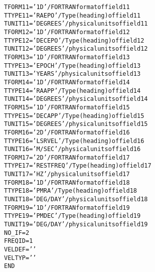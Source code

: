 \documentclass[twoside]{article}
\begin{document}
\begin{alltt}
TFORM11 = '1D      '           / FORTRAN format of field 11
TTYPE11 = 'RAEPO           '   / Type (heading) of field 11
TUNIT11 = 'DEGREES '           / physical units of field 11
TFORM12 = '1D      '           / FORTRAN format of field 12
TTYPE12 = 'DECEPO          '   / Type (heading) of field 12
TUNIT12 = 'DEGREES '           / physical units of field 12
TFORM13 = '1D      '           / FORTRAN format of field 13
TTYPE13 = 'EPOCH           '   / Type (heading) of field 13
TUNIT13 = 'YEARS   '           / physical units of field 13
TFORM14 = '1D      '           / FORTRAN format of field 14
TTYPE14 = 'RAAPP           '   / Type (heading) of field 14
TUNIT14 = 'DEGREES '           / physical units of field 14
TFORM15 = '1D      '           / FORTRAN format of field 15
TTYPE15 = 'DECAPP          '   / Type (heading) of field 15
TUNIT15 = 'DEGREES '           / physical units of field 15
TFORM16 = '2D      '           / FORTRAN format of field 16
TTYPE16 = 'LSRVEL          '   / Type (heading) of field 16
TUNIT16 = 'M/SEC   '           / physical units of field 16
TFORM17 = '2D      '           / FORTRAN format of field 17
TTYPE17 = 'RESTFREQ        '   / Type (heading) of field 17
TUNIT17 = 'HZ      '           / physical units of field 17
TFORM18 = '1D      '           / FORTRAN format of field 18
TTYPE18 = 'PMRA            '   / Type (heading) of field 18
TUNIT18 = 'DEG/DAY '           / physical units of field 18
TFORM19 = '1D      '           / FORTRAN format of field 19
TTYPE19 = 'PMDEC           '   / Type (heading) of field 19
TUNIT19 = 'DEG/DAY '           / physical units of field 19
NO_IF   =            2
FREQID  =            1
VELDEF  = '        '
VELTYP  = '        '
END
\end{alltt}
\end{document}
